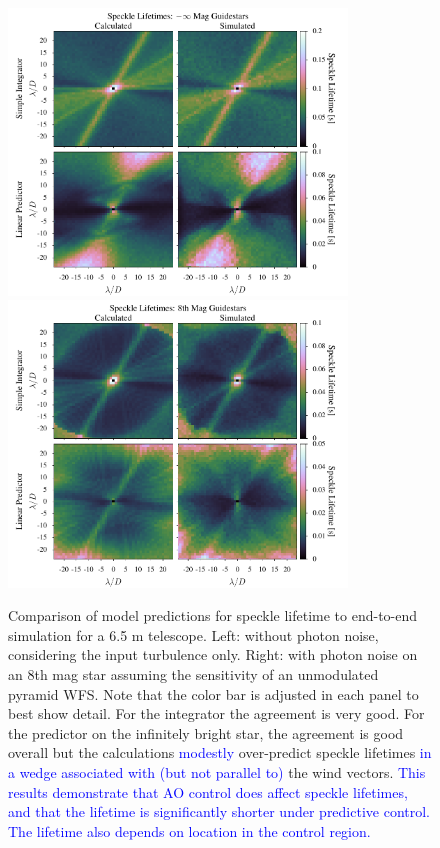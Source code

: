 \documentclass[10pt,preprint]{aastex631}
\newcommand{\jrmadd}[1]{\textcolor{blue}{#1}}
\begin{document}
\begin{figure}
\hspace{-0.3in}
\includegraphics[width=3.54in]{lifetimes0mag.pdf}
\includegraphics[width=3.54in]{lifetimes8mag.pdf}
\caption{Comparison of model predictions for speckle lifetime to end-to-end simulation for a 6.5 m telescope.  Left: without photon noise, considering the input turbulence only.  Right: with photon noise on an 8th mag star assuming the sensitivity of an unmodulated pyramid WFS. Note that the color bar is adjusted in each panel to best show detail. For the integrator the agreement is very good.  For the predictor on the infinitely bright star, the agreement is good overall but the calculations \jrmadd{modestly} over-predict speckle lifetimes \jrmadd{in a wedge associated with (but not parallel to)} the wind vectors.  \jrmadd{This results demonstrate that AO control does affect speckle lifetimes, and that the lifetime is significantly shorter under predictive control.  The lifetime also depends on location in the control region.}  \label{fig:lifetime_2Dcomp}}
\end{figure}
\end{document}
